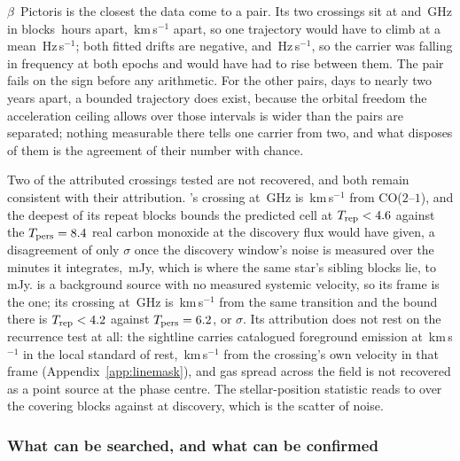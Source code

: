 $\beta$~Pictoris is the closest the data come to a pair. Its two crossings
sit at \TjBpNuLo{} and \TjBpNuHi\,GHz in blocks \TjBpDtH\,hours apart,
\TjBpDvKms\,km\,s$^{-1}$ apart, so one trajectory would have to climb at a
mean \TjBpMeanReq\,Hz\,s$^{-1}$; both fitted drifts are negative,
\TjBpDriftLo{} and \TjBpDriftHi\,Hz\,s$^{-1}$, so the carrier was falling in
frequency at both epochs and would have had to rise between them. The pair
fails on the sign before any arithmetic. For the other \TjNOpen{} pairs,
\TjDtOpenMinD{} days to nearly two years apart, a bounded trajectory does
exist, because the orbital freedom the acceleration ceiling allows over those
intervals is wider than the pairs are separated; nothing measurable there
tells one carrier from two, and what disposes of them is the agreement of
their number with chance.

Two of the \MkAttrTested{} attributed crossings tested are not recovered, and
both remain consistent with their attribution. \RqHrStar's crossing at
\RqHrFreq\,GHz is \RqHrDv\,km\,s$^{-1}$ from CO($2$--$1$), and the deepest of
its \RqHrNRep{} repeat blocks bounds the predicted cell at
$T_{\rm rep}<4.6$ against the $T_{\rm pers}=8.4$ real carbon
monoxide at the discovery flux would have given, a disagreement of only
\RqHrExcl$\sigma$ once the discovery window's noise is measured over the
\RqHrOnsMin{} minutes it integrates, \RqHrRms\,mJy, which is where the same
star's sibling blocks lie, \RqHrRmsLo{} to \RqHrRmsHi\,mJy. \RqAjStar{} is a
background source with no measured systemic velocity, so its frame is the
\RqAjFrame{} one; its crossing at \RqAjFreq\,GHz is \RqAjDv\,km\,s$^{-1}$
from the same transition and the bound there is $T_{\rm rep}<4.2$
against $T_{\rm pers}=6.2$, or \RqAjExcl$\sigma$. Its attribution does
not rest on the recurrence test at all: the sightline carries catalogued
foreground emission at \LsLupVco\,km\,s$^{-1}$ in the local standard of rest,
\LsLupDv\,km\,s$^{-1}$ from the crossing's own velocity in that frame
(Appendix~\ref{app:linemask}), and gas spread across the field is not
recovered as a point source at the phase centre. The stellar-position
statistic reads \RqAjStarLo{} to \RqAjStarHi{} over the \RqAjNRep{} covering
blocks against \RqAjTStar{} at discovery, which is the scatter of noise.

\subsubsection{What can be searched, and what can be confirmed}
\label{sec:confirmability}

